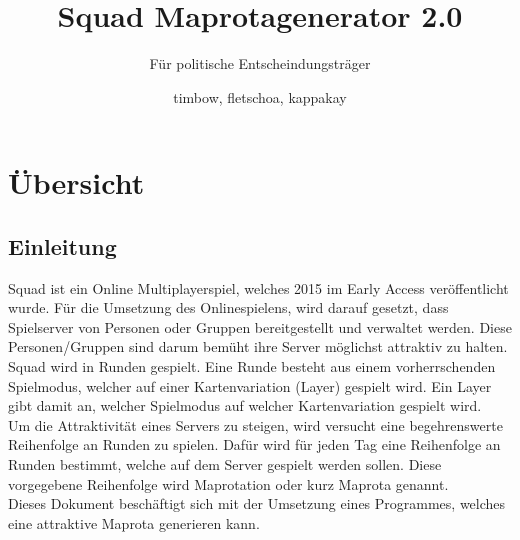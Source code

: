 \documentclass[a4paper, 11pt]{scrreprt}
\title{Squad Maprotagenerator 2.0}
\subtitle{Für politische Entscheindungsträger}
\author{timbow, fletschoa, kappakay}
\begin{document}
    
    \maketitle
    
    \tableofcontents
    \newpage


    \newpage
    \listoffigures
    \label{sec:abkuerzungverzeichnis}
    \newpage

    \begin{acronym}[Rota] %
    \end{acronym}


    \chapter{Übersicht}
    \section{Einleitung}
        Squad ist ein Online Multiplayerspiel, welches 2015 im \glqq{}Early Access\grqq{} veröffentlicht wurde.\cite{steampage}
        Für die Umsetzung des Onlinespielens, wird darauf gesetzt, 
        dass Spielserver von Personen oder Gruppen bereitgestellt und verwaltet werden.
        \cite{wiki.serverbrowser}
        Diese Personen/Gruppen sind darum bemüht ihre Server möglichst attraktiv zu halten. \\
        Squad wird in Runden gespielt. Eine Runde besteht aus einem vorherrschenden Spielmodus, 
        welcher auf einer Kartenvariation (Layer) gespielt wird. 
        Ein Layer gibt damit an, welcher Spielmodus auf welcher Kartenvariation gespielt wird.\\ 
        Um die Attraktivität eines Servers zu steigen, wird versucht eine begehrenswerte Reihenfolge an Runden zu spielen.
        Dafür wird für jeden Tag eine Reihenfolge an Runden bestimmt, welche auf dem Server gespielt werden sollen.
        Diese vorgegebene Reihenfolge wird Maprotation oder kurz Maprota genannt.\\
        Dieses Dokument beschäftigt sich mit der Umsetzung eines Programmes, welches eine attraktive Maprota generieren kann.   
\end{document}
